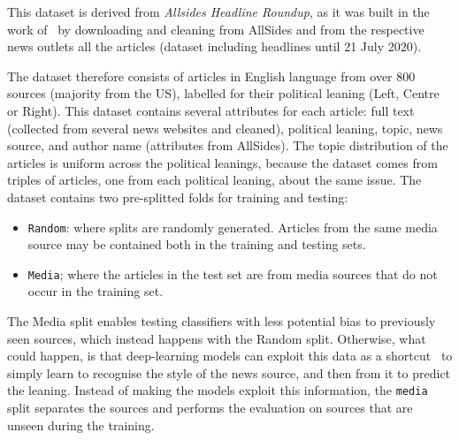 This dataset is derived from \emph{Allsides Headline Roundup\texttrademark}, as it was built in the work of~\citet{baly2020we} by downloading and cleaning from AllSides and from the respective news outlets all the articles (dataset including headlines until 21 July 2020).

The dataset therefore 
consists of articles in English language from over 800 sources (majority from the US), labelled for their political leaning (Left, Centre or Right).
This dataset contains several attributes for each article: full text (collected from several news websites and cleaned), political leaning, topic, news source, and author name (attributes from AllSides).
The topic distribution of the articles is uniform across the political leanings, because the dataset comes from triples of articles, one from each political leaning, about the same issue. 
The dataset contains two pre-splitted folds for training and testing:
\begin{itemize}
    \item \texttt{Random}: where splits are randomly generated. Articles from the same media source may be contained both in the training and testing sets. 
    \item \texttt{Media}; where the articles in the test set are from media sources that do not occur in the training set. %
\end{itemize}

The Media split enables testing classifiers with less potential bias to previously seen sources, which instead happens with the Random split.
Otherwise, what could happen, is that deep-learning models can exploit this data as a shortcut~\citep{geirhos2020shortcut,baly2020we} to simply learn to recognise the style of the news source, and then from it to predict the leaning.
Instead of making the models exploit this information, the \texttt{media} split separates the sources and performs the evaluation on sources that are unseen during the training.


